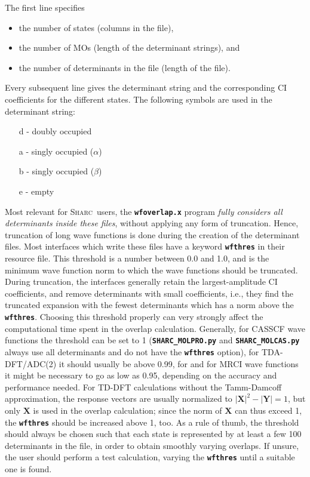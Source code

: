\documentclass[a4paper,10pt,DIV=15,openany]{scrbook}
\newcommand{\sharc}{\textsc{Sharc}}
\newcommand{\ttt}[1]{\textbf{\texttt{#1}}}
\begin{document}
The first line specifies
%
\begin{itemize}
\item the number of states (columns in the file),
\item the number of MOs (length of the determinant strings), and
\item the number of determinants in the file (length of the file).
\end{itemize}

Every subsequent line gives the determinant string and the corresponding CI coefficients for the different states.
The following symbols are used in the determinant string:

\begin{itemize}
\item[d] - doubly occupied
\item[a] - singly occupied ($\alpha$)
\item[b] - singly occupied ($\beta$)
\item[e] - empty
\end{itemize}

Most relevant for \sharc\ users, the \ttt{wfoverlap.x} program \emph{fully considers all determinants inside these files}, without applying any form of truncation. Hence, truncation of long wave functions is done during the creation of the determinant files.
Most interfaces which write these files have a keyword \ttt{wfthres} in their resource file. This threshold is a number between 0.0 and 1.0, and is the minimum wave function norm to which the wave functions should be truncated. During truncation, the interfaces generally retain the largest-amplitude CI coefficients, and remove determinants with small coefficients, i.e., they find the truncated expansion with the fewest determinants which has a norm above the \ttt{wfthres}.
Choosing this threshold properly can very strongly affect the computational time spent in the overlap calculation. Generally, for CASSCF wave functions the threshold can be set to 1 (\ttt{SHARC\_MOLPRO.py} and \ttt{SHARC\_MOLCAS.py} always use all determinants and do not have the \ttt{wfthres} option), for TDA-DFT/ADC(2) it should usually be above 0.99, for and for MRCI wave functions it might be necessary to go as low as 0.95, depending on the accuracy and performance needed.
For TD-DFT calculations without the Tamm-Damcoff approximation, the response vectors are usually normalized to $|\mathbf{X}|^2-|\mathbf{Y}|=1$, but only $\mathbf{X}$ is used in the overlap calculation; since the norm of $\mathbf{X}$ can thus exceed 1, the \ttt{wfthres} should be increased above 1, too.
As a rule of thumb, the threshold should always be chosen such that each state is represented by at least a few 100 determinants in the file, in order to obtain smoothly varying overlaps.
If unsure, the user should perform a test calculation, varying the \ttt{wfthres} until a suitable one is found.
\end{document}
